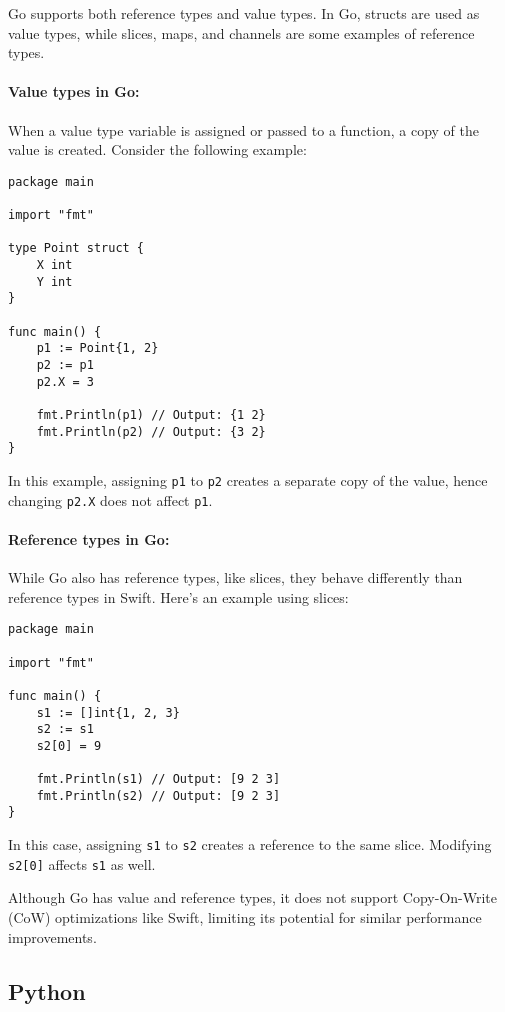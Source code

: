Go supports both reference types and value types. In Go, structs are used as value types, while slices, maps, and channels are some examples of reference types.

\paragraph{Value types in Go:}
When a value type variable is assigned or passed to a function, a copy of the value is created. Consider the following example:

\begin{verbatim}
package main

import "fmt"

type Point struct {
	X int
	Y int
}

func main() {
	p1 := Point{1, 2}
	p2 := p1
	p2.X = 3

	fmt.Println(p1) // Output: {1 2}
	fmt.Println(p2) // Output: {3 2}
}
\end{verbatim}

In this example, assigning \texttt{p1} to \texttt{p2} creates a separate copy of the value, hence changing \texttt{p2.X} does not affect \texttt{p1}.

\paragraph{Reference types in Go:}
While Go also has reference types, like slices, they behave differently than reference types in Swift. Here's an example using slices:

\begin{verbatim}
package main

import "fmt"

func main() {
	s1 := []int{1, 2, 3}
	s2 := s1
	s2[0] = 9

	fmt.Println(s1) // Output: [9 2 3]
	fmt.Println(s2) // Output: [9 2 3]
}
\end{verbatim}

In this case, assigning \texttt{s1} to \texttt{s2} creates a reference to the same slice. Modifying \texttt{s2[0]} affects \texttt{s1} as well.

Although Go has value and reference types, it does not support Copy-On-Write (CoW) optimizations like Swift, limiting its potential for similar performance improvements.

\subsection{Python}


